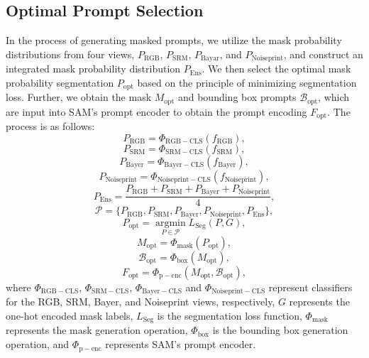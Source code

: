 \subsection{Optimal Prompt Selection}
In the process of generating masked prompts, we utilize the mask probability distributions from four views, $P_{\mathrm{RGB}}$, $P_{\mathrm{SRM}}$, $P_{\mathrm{Bayar}}$, and $P_{\mathrm{Noiseprint}}$, and construct an integrated mask probability distribution $P_{\text{Ens}}$. We then select the optimal mask probability segmentation $P_{\mathrm{opt}}$ based on the principle of minimizing segmentation loss. Further, we obtain the mask $M_{\mathrm{opt}}$ and bounding box prompts $\mathcal{B}_{\mathrm{opt}}$, which are input into SAM's prompt encoder to obtain the prompt encoding $F_{\mathrm{opt}}$. The process is as follows:
\begin{equation}
P_{\mathrm{RGB}} = \Phi_{\mathrm{RGB}-\mathrm{CLS}}(f_{\mathrm{RGB}}),
\end{equation}
\begin{equation}
P_{\mathrm{SRM}} = \Phi_{\mathrm{SRM-CLS}}(f_{\mathrm{SRM}}),
\end{equation}
\begin{equation}
P_{\mathrm{Bayer}} = \Phi_{\mathrm{Bayer-CLS}}(f_{\mathrm{Bayer}}),
\end{equation}
\begin{equation}
P_{\mathrm{Noiseprint}} = \Phi_{\mathrm{Noiseprint-CLS}}(f_{\mathrm{Noiseprint}}),
\end{equation}
\begin{equation}
P_{\text{Ens}} = \frac{P_{\mathrm{RGB}} + P_{\mathrm{SRM}} + P_{\mathrm{Bayer}}+P_{\mathrm{Noiseprint}}}{4},
\end{equation}
\begin{equation}
\mathcal{P}=\{P_{\mathrm{RGB}}, P_{\mathrm{SRM}}, P_{\mathrm{Bayer}},P_{\mathrm{Noiseprint}}, P_{\text{Ens}}\},
\end{equation}
\begin{equation}
P_{\text{opt}} = \underset{P \in \mathcal{P}}{\operatorname{argmin}} L_{\mathrm{Seg}}(P, G),
\end{equation}
\begin{equation}
M_{\mathrm{opt}} = \Phi_{\mathrm{mask}}(P_{\mathrm{opt}}),
\end{equation}
\begin{equation}
\mathcal{B}_{\mathrm{opt}} = \Phi_{\mathrm{box}}(M_{\mathrm{opt}}),
\end{equation}
\begin{equation}
F_{\mathrm{opt}} = \Phi_{\mathrm{p-enc}}(M_{\mathrm{opt}}, \mathcal{B}_{\mathrm{opt}}),
\end{equation}
where $\Phi_{\mathrm{RGB-CLS}}$, $\Phi_{\mathrm{SRM-CLS}}$, $\Phi_{\mathrm{Bayer-CLS}}$ and $\Phi_{\mathrm{Noiseprint-CLS}}$ represent classifiers for the RGB, SRM, Bayer, and Noiseprint views, respectively, $G$ represents the one-hot encoded mask labels, $L_{\mathrm{Seg}}$ is the segmentation loss function, $\Phi_{\mathrm{mask}}$ represents the mask generation operation, $\Phi_{\mathrm{box}}$ is the bounding box generation operation, and $\Phi_{\mathrm{p-enc}}$ represents SAM's prompt encoder.

